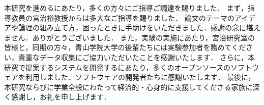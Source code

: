 本研究を進めるにあたり，多くの方々にご指導ご調達を賜りました．
まず，指導教員の宮治裕教授からは多大なご指導を賜りました．
論文のテーマのアイデアや論理の組み立て方，困ったときに手助けをいただきました．感謝の念に堪えません．ありがとうございました．
また，実験の実施にあたり，宮治研究室の皆様と，同期の方々，青山学院大学の後輩たちには実験参加者を務めてください，貴重なデータ収集にご協力いただいたことを感謝いたします．
さらに，本研究で提案するシステムを開発するにあたり，多くのオープンソースのソフトウェアを利用しました．ソフトウェアの開発者たちに感謝いたします．
最後に，本研究ならびに学業全般にわたって経済的・心身的に支援してくださる家族に深く感謝し，お礼を申し上げます．